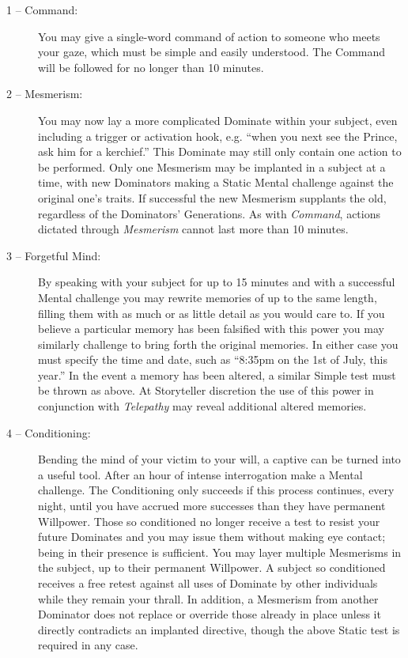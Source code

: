 \begin{description}
	\item[1 -- Command:]  You may give a single-word command of action to someone who meets your 
	gaze, which must be simple and easily understood.  The Command will be followed for 
	no longer than 10 minutes.
	\item[2 -- Mesmerism:]  You may now lay a more complicated Dominate within your subject, 
	even including a trigger or activation hook, e.g. ``when you next see the Prince, ask him 
	for a kerchief.''  This Dominate may still only contain one action to be performed.  Only 
	one Mesmerism may be implanted in a subject at a time, with new Dominators making a Static 
	Mental challenge against the original one's traits.  If successful the new Mesmerism supplants 
	the old, regardless of the Dominators' Generations. As with \emph{Command}, actions dictated 
	through \emph{Mesmerism} cannot last more than 10 minutes.
	\item[3 -- Forgetful Mind:]  By speaking with your subject for up to 15 minutes and with a 
	successful Mental challenge you may rewrite memories of up to the same length, filling them 
	with as much or as little detail as you would care to.  If you believe a particular 
	memory has been falsified with this power you may similarly challenge to bring forth 
	the original memories.  In either case you must specify the time and date, such as 
	``8:35pm on the 1st of July, this year.''  In the event a memory has been altered, a similar Simple 
	test must be thrown as above.  At Storyteller discretion the use of this power 
	in conjunction with \emph{Telepathy} may reveal additional altered memories. 
	\item[4 -- Conditioning:]  Bending the mind of your victim to your will, a captive can be 
	turned into a useful tool.  After an hour of intense interrogation make a Mental challenge.  
	The Conditioning only succeeds if this process continues, every night, until you have accrued 
	more successes than they have permanent Willpower.   Those so conditioned no longer receive a 
	test to resist your future Dominates and you may issue them without making eye contact; being 
	in their presence is sufficient.  You may layer multiple Mesmerisms in the subject, up to their 
	permanent Willpower.  A subject so conditioned receives a free retest against all uses of 
	Dominate by other individuals while they remain your thrall.  In addition, a Mesmerism from 
	another Dominator does not replace or override those already in place unless it directly 
	contradicts an implanted directive, though the above Static test is required in any case.
	

\end{description}

